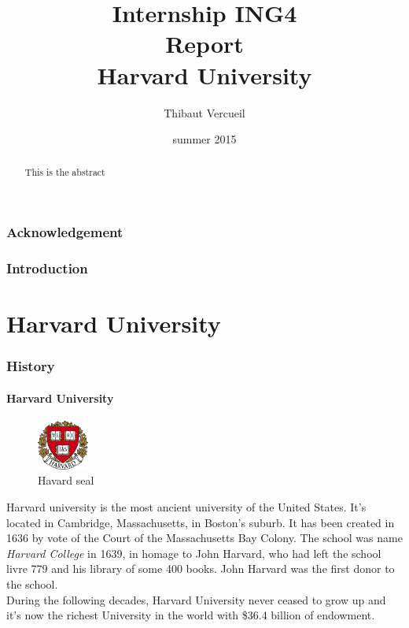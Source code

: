 \documentclass[10pt,a4paper]{article}
\title{{\Huge Internship ING4}\\ Report\\ \vspace{1cm} Harvard University}
\author{Thibaut Vercueil}
\date{summer 2015}
\begin{document}
\maketitle

\begin{abstract}
This is the abstract\end{abstract}
\newpage
\tableofcontents
\newpage
\section*{Acknowledgement}

\section{Introduction}
\newpage
\part{Harvard University}


\section{History}

\subsection{Harvard University}


\begin{figure}
\centering
\includegraphics[width=0.15\textwidth]{harvardlogo.png}
\caption*{Havard seal}
\end{figure}
Harvard university is the most ancient university of the United States. It's located in Cambridge, Massachusetts, in Boston's suburb. It has been created in 1636 by vote of the Court of the Massachusetts Bay Colony. The school was name \textit{Harvard College} in 1639, in homage to John Harvard, who had left the school livre 779 and his library of some 400 books. John Harvard was the first donor to the school.\\
During the following decades, Harvard University never ceased to grow up and it's now the richest University in the world with \$36.4 billion of endowment.
\end{document}

